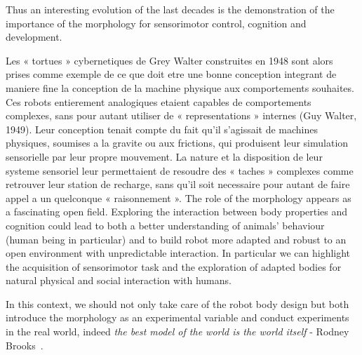 Thus an interesting evolution of the last decades is the demonstration of the importance of the morphology for sensorimotor control, cognition and development.

Les « tortues » cybernetiques de Grey Walter construites en 1948 sont alors prises comme exemple de ce que doit etre une bonne conception integrant de maniere fine la conception de la machine physique aux comportements souhaites. Ces robots entierement analogiques etaient capables de comportements complexes, sans pour autant utiliser de « representations » internes (Guy Walter, 1949). Leur conception tenait compte du fait qu’il s’agissait de machines physiques, soumises a la gravite ou aux frictions, qui produisent leur simulation sensorielle par leur propre mouvement. La nature et la disposition de leur systeme sensoriel leur permettaient de resoudre des « taches » complexes comme retrouver leur station de recharge, sans qu’il soit necessaire pour autant de faire appel a un quelconque « raisonnement ».
The role of the morphology appears as a fascinating open field. Exploring the interaction between body properties and cognition could lead to both a better understanding of animals’ behaviour (human being in particular) and to build robot more adapted and robust to an open environment with unpredictable interaction. In particular we can highlight the acquisition of sensorimotor task and the exploration of adapted bodies for natural physical and social interaction with humans.

In this context, we should not only take care of the robot body design but both introduce the morphology as an experimental variable and conduct experiments in the real world, indeed \emph{the best model of the world is the world itself} - Rodney Brooks~\cite{brooks1991intelligence}.

